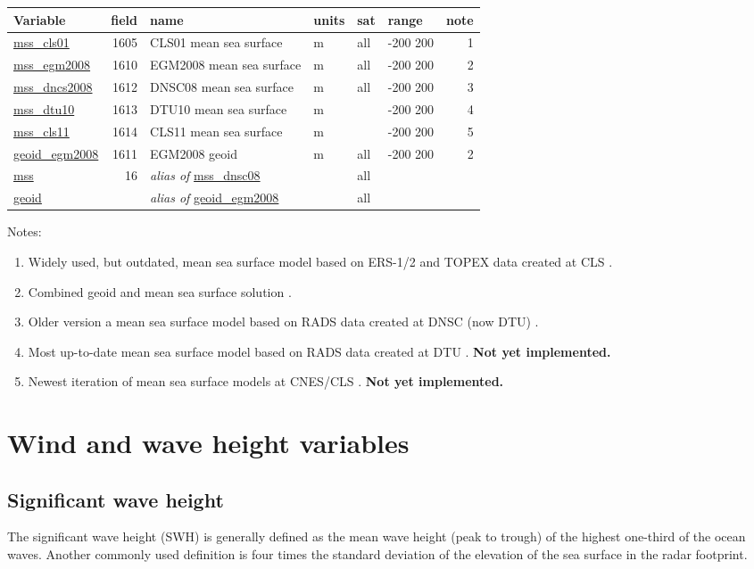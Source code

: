 \documentclass[a4paper,11pt,openany,natbib]{thesis}
\makeatletter
\newcommand\var[1]{\url{#1}\index{variables!#1@\protect\url{#1}}}
\newcommand\alias[1]{\emph{alias of} \var{#1}}
\newenvironment{vartable}{
\begin{table}[ht]
\small
\begin{tabular}{lrllllr}
\hline
Variable & field & name & units & sat & range & note \\
\hline
}{
\hline
\end{tabular}
\end{table}
}
\makeatother
\begin{document}
\begin{vartable}
\var{mss_cls01} & 1605 & CLS01 mean sea surface & m & all & -200 200 & 1 \\
\var{mss_egm2008} & 1610 & EGM2008 mean sea surface & m & all & -200 200 & 2 \\
\var{mss_dncs2008} & 1612 & DNSC08 mean sea surface & m & all & -200 200 & 3 \\
\var{mss_dtu10} & 1613 & DTU10 mean sea surface & m &  & -200 200 & 4 \\
\var{mss_cls11} & 1614 & CLS11 mean sea surface & m &  & -200 200 & 5 \\
\var{geoid_egm2008} & 1611 & EGM2008 geoid & m & all & -200 200 & 2 \\ 
\hline
\var{mss} & 16 & \alias{mss_dnsc08} && all && \\
\var{geoid} && \alias{geoid_egm2008} && all && \\
\end{vartable}

Notes:
\begin{enumerate}
\item Widely used, but outdated, mean sea surface model based on ERS-1/2 and TOPEX data created at CLS \citep{hernandez2001}.
\item Combined geoid and mean sea surface solution \citep{pavlis2008}.
\item Older version a mean sea surface model based on RADS data created at DNSC (now DTU) \citep{andersen2009}.
\item Most up-to-date mean sea surface model based on RADS data created at DTU \citep{andersen2010}. \textbf{Not yet implemented.}
\item Newest iteration of mean sea surface models at CNES/CLS \citep{schaeffer2010}. \textbf{Not yet implemented.}
\end{enumerate}

\chapter{Wind and wave height variables}
\section{Significant wave height}
\label{var:swh}
The significant wave height (SWH) is generally defined as the mean wave height (peak to trough) of the highest one-third of the ocean waves. Another commonly used definition is four times the standard deviation of the elevation of the sea surface in the radar footprint.
\end{document}
